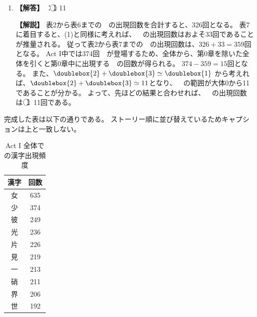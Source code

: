 \documentclass[uplatex,dvipdfmx,paper=a4paper,fontsize=11pt,jafontscale=0.9247,lang=ja]{jlreq}
\begin{document}
\begin{enumerate}[label=(\arabic*)]
    \textbf{【解説】}
    表5 ~~では各漢字の出現回数が急増しており、物語のクライマックスである「Final Verdict」であることを示唆している。
    また、メモ2の「章番号V」から~~がAdverse Preludeであることが確定し、そこから前後の文脈、特異な漢字を整理することで全章を特定できる。

  \item \textbf{【解答】} ：\textcircled{\scriptsize 1} 11
    
    \textbf{【解説】}
    表2から表6までの~~の出現回数を合計すると、326回となる。
    表7に着目すると、(1)と同様に考えれば、~~の出現回数はおよそ33回であることが推量される。
    従って表2から表7までの~~の出現回数は、$326 + 33 = 359$回となる。
    Act I中では374回~~が登場するため、全体から、第0章を除いた全体を引くと第0章中に出現する~~の回数が得られる。
    $374 - 359 = 15$回となる。
    また、$\doublebox{2} + \doublebox{3} \simeq \doublebox{1}$ から考えれば、$\doublebox{2} + \doublebox{3} \simeq 11$となり、~~の範囲が大体0から11であることが分かる。
    よって、先ほどの結果と合わせれば、~~の出現回数は~\textcircled{\scriptsize 1}~11回である。
\end{enumerate}
完成した表は以下の通りである。
ストーリー順に並び替えているためキャプションは上と一致しない。

\begin{table}[h]
  \centering
  \caption{Act \protect$\mathrm{I}$ 全体での漢字出現頻度}
\begin{tabular}{|c c|} \hline
  漢字 & 回数\\ \hline
  女 & 635 \\
  少 & 374 \\
  彼 & 249 \\
  光 & 236 \\
  片 & 226 \\  
  見 & 219 \\
  一 & 213 \\
  硝 & 211 \\
  界 & 206 \\
  世 & 192 \\ \hline
\end{tabular}
\end{table}
\end{document}
